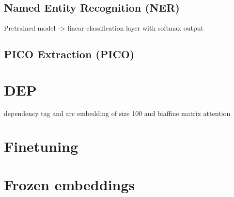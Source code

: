 \subsection{Named Entity Recognition (NER)}
Pretrained model -> linear classification layer with softmax output
\subsection{PICO Extraction (PICO)}

\section{DEP}
dependency  tag and arc embedding of size 100 and biaffine matrix attention 
\section{Finetuning}
\section{Frozen embeddings}

